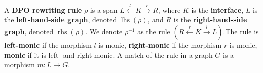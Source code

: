 \begin{definition}
  \label{def:grs:dpo_rule}
A \textbf{DPO rewriting rule} $\rho$ is a span \( L \overset{l}{\leftarrow} K \overset{r}{\rightarrow} R \), where \( K \) is the \textbf{interface}, \( L \) is the \textbf{left-hand-side graph}, denoted \( \operatorname{lhs}(\rho) \), and \( R \) is the \textbf{right-hand-side graph}, denoted \( \operatorname{rhs}(\rho) \). We denote $\rho^{-1}$ as the rule $(R \overset{r}{\leftarrow} K \overset{l}{\rightarrow} L)$.The rule is \textbf{left-monic} if the morphism \( l \) is monic, \textbf{right-monic} if the morphism \( r \) is monic, \textbf{monic} if it is left- and right-monic.  
A match of the rule in a graph \( G \) is a morphism \( m: L \rightarrow G \).   
\end{definition}